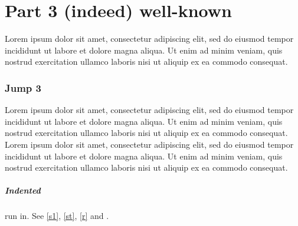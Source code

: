 \documentclass{article}
\begin{document}
\section{Part 3 (indeed) well-known}\label{s3}
Lorem ipsum dolor sit amet, consectetur adipiscing elit, sed do eiusmod tempor incididunt ut labore et dolore magna aliqua. Ut enim ad minim veniam, quis nostrud exercitation ullamco laboris nisi ut aliquip ex ea commodo consequat.

\subsubsection{Jump 3}
Lorem ipsum dolor sit amet, consectetur adipiscing elit, sed do eiusmod tempor incididunt ut labore et dolore magna aliqua. Ut enim ad minim veniam, quis nostrud exercitation ullamco laboris nisi ut aliquip ex ea commodo consequat. Lorem ipsum dolor sit amet, consectetur adipiscing elit, sed do eiusmod tempor incididunt ut labore et dolore magna aliqua. Ut enim ad minim veniam, quis nostrud exercitation ullamco laboris nisi ut aliquip ex ea commodo consequat.

\subparagraph{Indented} run in. See \ref{s1}, \ref{st}, \ref{r} and \pageref{s3}.
\end{document}
